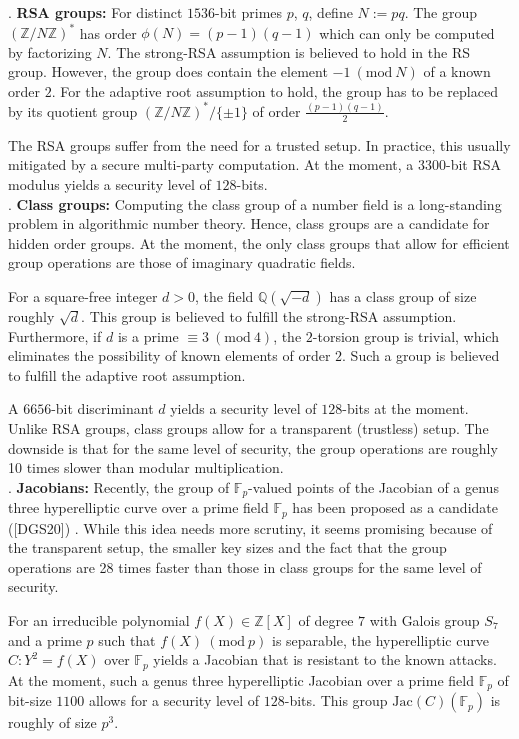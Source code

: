 \documentclass[11pt, lettersize, notitlepage, leqno, footskip=0.6cm]{article}
\newcommand{\bz}{\mathbb Z}
\newcommand{\bq}{\mathbb Q}
\newcommand{\bFp}{\mathbb{F}_p}
\newcommand{\mr}{\mathrm}
\newcommand{\Jac}{\mr{Jac}}
\newcommand{\Mod}[1]{\ (\mathrm{mod}\ #1)}
\numberwithin{equation}{section}
\begin{document}
. \textbf{RSA groups:} For distinct $1536$-bit primes $p$, $q$, define $N:= pq$. The group $(\bz/N\bz)^*$ has order $\phi(N) = (p-1)(q-1)$ which can only be computed by factorizing $N$. The strong-RSA assumption is believed to hold in the RS group. However, the group does contain the element $-1\Mod{N}$ of a known order $2$. For the adaptive root assumption to hold, the group has to be replaced by its quotient group $(\bz/N\bz)^*/\{\pm 1\}$ of order $\frac{(p-1)(q-1)}{2}.$ 

The RSA groups suffer from the need for a trusted setup. In practice, this usually mitigated by a secure multi-party computation. At the moment, a $3300$-bit RSA modulus yields a security level of $128$-bits.\\


. \textbf{Class groups:} Computing the class group of a number field is a long-standing problem in algorithmic number theory. Hence, class groups are a candidate for hidden order groups. At the moment, the only class groups that allow for efficient group operations are those of imaginary quadratic fields.

For a square-free integer $d > 0$, the field $\bq(\sqrt{-d})$ has a class group of size roughly $\sqrt{d}$. This group is believed to fulfill the strong-RSA assumption. Furthermore, if $d$ is a prime $\equiv 3 \Mod{4}$, the $2$-torsion group is trivial, which eliminates the possibility of known elements of order $2$. Such a group is believed to fulfill the adaptive root assumption.

A $6656$-bit discriminant $d$ yields a security level of $128$-bits at the moment. Unlike RSA groups, class groups allow for a transparent (trustless) setup. The downside is that for the same level of security, the group operations are roughly 10 times slower than modular multiplication.\\

. \textbf{Jacobians:} Recently, the group of $\bFp$-valued points of the Jacobian of a genus three hyperelliptic curve over a prime field $\bFp$ has been proposed as a candidate ([DGS20]) . While this idea needs more scrutiny, it seems promising because of the transparent setup, the smaller key sizes and the fact that the group operations are 28 times faster than those in class groups for the same level of security.

For an irreducible polynomial $f(X)\in \bz[X]$ of degree $7$ with Galois group $S_7$ and a prime $p$ such that $f(X)\Mod{p}$ is separable, the hyperelliptic curve $C:Y^2 = f(X)$ over $\bFp$ yields a Jacobian that is resistant to the known attacks. At the moment, such a genus three hyperelliptic Jacobian over a prime field $\bFp$ of bit-size $1100$ allows for a security level of $128$-bits. This group $\Jac(C)(\bFp)$ is roughly of size $p^3$. 
\end{document}
